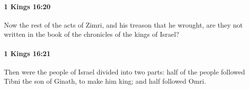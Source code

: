 		\paragraph{1 Kings 16:20} %
			\label{1KINGS-16-20}

			Now the rest of the acts of Zimri, and his treason that he wrought, are they not written in the book of the chronicles of the kings of Israel?


		\paragraph{1 Kings 16:21} %
			\label{1KINGS-16-21}

			Then were the people of Israel divided into two parts: half of the people followed Tibni the son of Ginath, to make him king; and half followed Omri.


